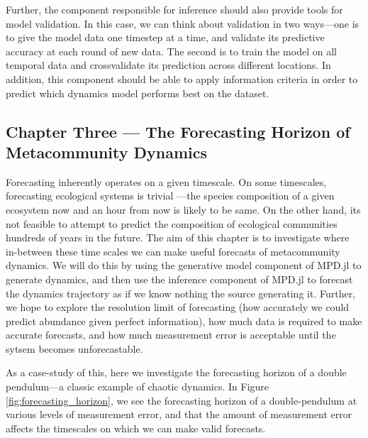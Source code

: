 \documentclass[]{article}
\begin{document}
Further, the component responsible for inference should also provide tools for model validation. In this case, we can think about validation in two ways---one is to give the model data one timestep at a time, and validate its predictive accuracy at each round of new data. The second is to train the model on all temporal data and crossvalidate its prediction across different locations. In addition, this component should be able to apply information criteria in order to predict which dynamics model performs best on the dataset. 



\subsection{Chapter Three --- The Forecasting Horizon of Metacommunity Dynamics}

Forecasting inherently operates on a given timescale.
On some timescales, forecasting ecological systems is trivial \cite{crutchfield_semantics}---the species composition of a given ecosystem now and an hour from now is likely to be same. On the other hand, its not feasible to attempt to predict the composition of ecological communities hundreds of years in the future. The aim of this chapter is to investigate where in-between these time scales we can make useful forecasts of metacommunity dynamics. We will do this by using the generative model component of MPD.jl to generate dynamics, and then use the inference component of MPD.jl to forecast the dynamics trajectory as if we know nothing the source generating it. 
Further, we hope to explore the resolution limit of forecasting (how accurately we could predict abundance given perfect information), how much data is required to make accurate forecasts, and how much measurement error is acceptable until the sytsem becomes unforecastable.

As a case-study of this, here we investigate the forecasting horizon of a double pendulum---a classic example of chaotic dynamics. In Figure \ref{fig:forecasting_horizon}, we see the forecasting horizon of a double-pendulum at various levels of measurement error, and that the amount of measurement error affects the timescales on which we can make valid forecasts. 
\end{document}
